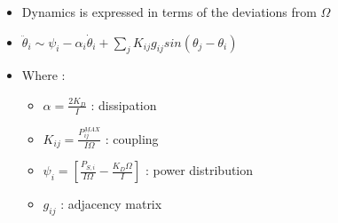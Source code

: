 \documentclass[xcolor=dvipsnames]{beamer}
\begin{document}
\begin{frame}
\begin{small}
\begin{itemize}
		\item Dynamics is expressed in terms of the deviations from $ \Omega $
		\item $ \ddot{\theta}_i \sim \psi_i - \alpha_i \dot{\theta}_i + \sum_{j}K_{ij}g_{ij}sin(\theta_j-\theta_i) $
		\item Where :
			\begin{itemize}
				\item $ \alpha = \frac{2K_D}{I} $ : dissipation
				\item $ K_{ij} = \frac{P_{ij}^{MAX}}{I\Omega} $ : coupling
				\item $ \psi_i = \left[ \frac{P_{S,i}}{I\Omega} - \frac{K_D\Omega}{I} \right] $ : power distribution
				\item $g_{ij} $ : adjacency matrix
			\end{itemize} 
		
	\end{itemize}
	\end{small}
\end{frame}
\end{document}
